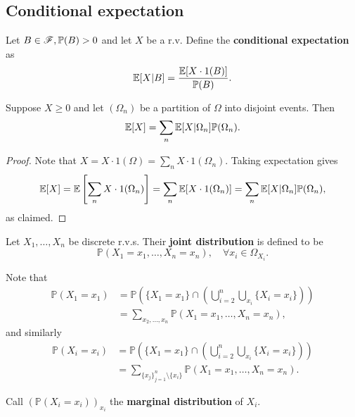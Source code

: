 \subsection{Conditional expectation}
\begin{definition}
    Let $B\in \mathscr{F},{\mathbb{P}}(B)>0$ and let $ X $ be a r.v. Define the \textbf{conditional expectation} as
    \[
        {\mathbb{E}}[X|B] = \frac{{\mathbb{E}}[X\cdot 1(B)]}{{\mathbb{P}}(B)}.
    \]
\end{definition}
\begin{proposition}\label{prop:Law of total expectation}
    Suppose $X\ge 0$ and let $ (\Omega_n) $ be a partition of $\Omega$ into disjoint events. Then 
    \[
        {\mathbb{E}}[X] = \sum_{n} {\mathbb{E}}[X|\Omega_n]\mathbb{P}(\Omega_n).
    \]
\end{proposition}
\begin{proof}
    Note that $ X=X \cdot 1(\Omega)=\sum_{n} X \cdot 1(\Omega_n) $. Taking expectation gives
    \[
    {\mathbb{E}}[X] = {\mathbb{E}}\left[ \sum_{n} X \cdot 1(\Omega_n) \right] = \sum_{n}{\mathbb{E}}[X\cdot 1(\Omega_n)]=\sum_{n} {\mathbb{E}}[X|\Omega_n]\mathbb{P}(\Omega_n),
    \]
    as claimed.
\end{proof}

\begin{definition}
    Let $ X_1,\dots,X_n $ be discrete r.v.s. Their \textbf{joint distribution} is defined to be 
    \[
        \mathbb{P}(X_1=x_1,\dots,X_n=x_n), \quad \forall x_i\in \Omega_{X_i}.
    \]
\end{definition}

Note that 
\begin{align*}
    \mathbb{P}(X_1=x_1) &= \mathbb{P}\left( \{X_1=x_1\} \cap \left( \bigcup_{i=2}^{n} \bigcup_{x_i} \{X_i=x_i\} \right) \right)\\ 
    &= \sum_{x_2,\dots,x_n} \mathbb{P}(X_1=x_1,\dots,X_n=x_n),
\end{align*}
and similarly 
\begin{align*}
    \mathbb{P}(X_i=x_i) &= \mathbb{P}\left( \{X_1=x_1\} \cap \left( \bigcup_{i=2}^{n} \bigcup_{x_i} \{X_i=x_i\} \right) \right)\\ 
    &= \sum_{\{x_j\}_{j=1}^n\setminus\{x_i\}} \mathbb{P}(X_1=x_1,\dots,X_n=x_n).
\end{align*}
\begin{definition}
    Call $ (\mathbb{P}(X_i=x_i) )_{x_i}$ the \textbf{marginal distribution} of $X_i$.
\end{definition}

